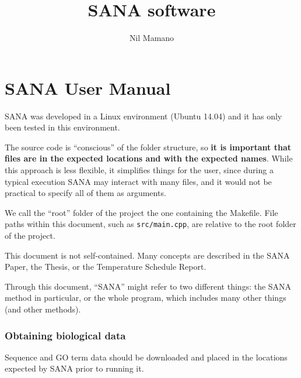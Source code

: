 \documentclass[]{article}
\title{SANA software}
\author{Nil Mamano}
\begin{document}
\maketitle


\part{SANA User Manual} %

SANA was developed in a Linux environment (Ubuntu 14.04) and it has only been tested in this environment.

The source code is ``conscious'' of the folder structure, so \textbf{it is important that files are in the expected locations and with the expected names}. While this approach is less flexible, it simplifies things for the user, since during a typical execution SANA may interact with many files, and it would not be practical to specify all of them as arguments.

We call the ``root'' folder of the project the one containing the Makefile. File paths within this document, such as \texttt{src/main.cpp}, are relative to the root folder of the project.

This document is not self-contained. Many concepts are described in the SANA Paper, the Thesis, or the Temperature Schedule Report.

Through this document, ``SANA'' might refer to two different things: the SANA method in particular, or the whole program, which includes many other things (and other methods).

\section{Obtaining biological data}\label{b:obtainbio}

Sequence and GO term data should be downloaded and placed in the locations expected by SANA prior to running it.
\end{document}
